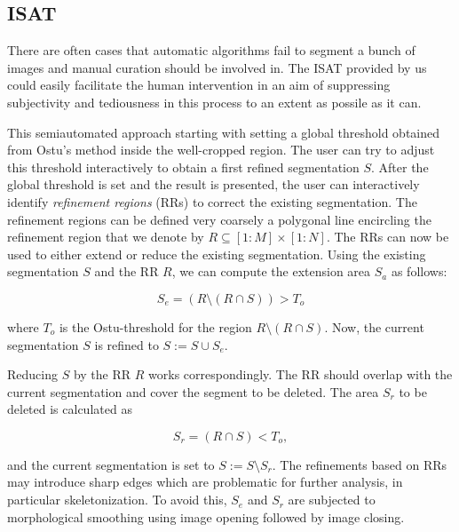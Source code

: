 

\subsection{\acf{ISAT}}

There are often cases that automatic algorithms fail to segment a bunch of images and manual curation should be involved in. The \acf{ISAT} provided by us could easily facilitate the human intervention in an aim of suppressing subjectivity and tediousness in this process to an extent as possile as it can.

This semiautomated approach starting with setting a global threshold obtained from Ostu's method inside the well-cropped region. The user can try to adjust this threshold interactively to obtain a first refined segmentation $S$. After the global threshold is set and the result is presented, the user can interactively identify \emph{refinement regions} (RRs) to correct the existing segmentation. The refinement regions can be defined very coarsely a polygonal line encircling the refinement region that we denote by $R\subseteq[1:M]\times[1:N]$. The RRs can now be used to either extend or reduce the existing segmentation. Using the existing segmentation $S$ and the RR $R$, we can compute the extension area $S_a$ as follows:

$$S_e=(R\setminus (R\cap S))>T_o$$

where $T_o$ is the Ostu-threshold for the region $R\setminus(R\cap S)$. Now, the current segmentation $S$ is refined to $S:=S\cup S_e$.

Reducing $S$ by the RR $R$ works correspondingly. The RR should overlap with the current segmentation and cover the segment to be deleted. The area $S_r$ to be deleted is calculated as

$$ S_r=(R\cap S)<T_o,$$

and the current segmentation is set to $S:=S\setminus S_r$. The refinements based on RRs may introduce sharp edges which are problematic for further analysis, in particular skeletonization. To avoid this, $S_e$ and $S_r$ are subjected to morphological smoothing using image opening followed by image closing.

